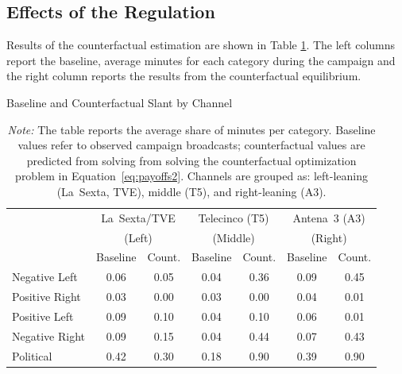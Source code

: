 \documentclass[12pt]{article}
\begin{document}
	
	
	
	
	
	\subsection{Effects of the Regulation}
	
	Results of the counterfactual estimation are shown in Table \ref{tab:counter}.  The left columns report the baseline, average minutes for each category during the campaign and the right column reports the results from the counterfactual equilibrium. 
	
	
	
	\begin{table}[!htbp]
		\caption{Baseline and Counterfactual Slant by Channel}
		\label{tab:counter}
		\centering\small
		\begin{tabular}{lcccccc}
			\toprule
			& \multicolumn{2}{c}{La~Sexta/TVE} & \multicolumn{2}{c}{Telecinco (T5)} & \multicolumn{2}{c}{Antena~3 (A3)} \\
			& \multicolumn{2}{c}{(Left)} & \multicolumn{2}{c}{(Middle)} & \multicolumn{2}{c}{(Right)} \\
			& Baseline & Count. & Baseline & Count. & Baseline & Count. \\
			\midrule
			Negative Left & 0.06 & 0.05 & 0.04 & 0.36 & 0.09 & 0.45 \\
			\midrule
			Positive Right & 0.03 & 0.00 & 0.03 & 0.00 & 0.04 & 0.01 \\
			\midrule
			Positive Left & 0.09 & 0.10 & 0.04 & 0.10 & 0.06 & 0.01 \\
			\midrule
			Negative Right & 0.09 & 0.15 & 0.04 & 0.44 & 0.07 & 0.43 \\
			\midrule
			Political & 0.42 & 0.30 & 0.18 & 0.90 & 0.39 & 0.90 \\
			\midrule
			\bottomrule
		\end{tabular}
		\vspace{0.5em}
		\caption*{\small \emph{Note:} The table reports the average share of minutes per category. Baseline values refer to observed campaign broadcasts; counterfactual values are predicted from solving from solving the counterfactual optimization problem in Equation~\eqref{eq:payoffs2}.      Channels are grouped as: left-leaning (La~Sexta, TVE), middle (T5), and right-leaning (A3).}
	\end{table}
	
\end{document}
